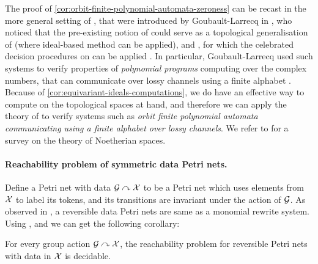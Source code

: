 \begin{remark}
  \label{rem:topological-wsts}
  The proof of \cref{cor:orbit-finite-polynomial-automata-zeroness} can be
  recast in the more general setting of 
  , that were introduced by
  Goubault-Larrecq in \cite{JGL07}, who noticed that the pre-existing notion of
   could serve as a topological generalisation of
   (where ideal-based method can be applied),
  and 
  , for which the celebrated decision procedures on
   can be applied \cite{ABDU96}. In particular,
  Goubault-Larrecq used such systems to verify properties of \emph{polynomial
  programs} computing over the complex numbers, that can communicate over lossy
  channels using a finite alphabet \cite{JGL10}. 
  Because of \cref{cor:equivariant-ideals-computations}, we do have an 
  effective way to compute on the topological spaces at hand, 
  and therefore we can apply the theory of
   to verify systems
  such as \emph{orbit finite polynomial automata communicating using a finite alphabet
  over lossy channels}.
  We refer to \cite[Chapter 9]{JGL13} for a survey on the theory of 
  Noetherian spaces.
\end{remark}



\paragraph{Reachability problem of symmetric data Petri nets.}
Define a Petri net with data $\mathcal{G}\curvearrowright\mathcal{X}$ to be a Petri net which uses elements from $\mathcal{X}$ to label its tokens,
and its transitions are invariant under the action of $\mathcal{G}$.
As observed in \cite[Section 8]{GHOLAS24},
a reversible data Petri nets are same as a monomial rewrite system.
Using ,  and \cite[Theorem 64]{GHOLAS24} we can get the following corollary:
%
\begin{corollary}\label{cor:rev data VAS}
  For every  group action $\mathcal{G}\curvearrowright\mathcal{X}$,
  the reachability problem for reversible Petri nets with data in $\mathcal{X}$ is decidable.
\end{corollary}



